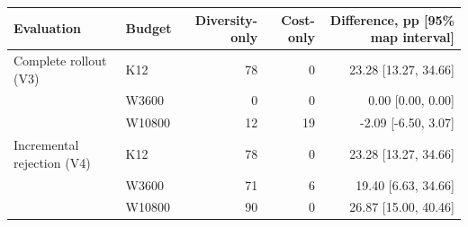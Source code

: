 \begin{tabular}{llrrr}
\toprule
Evaluation & Budget & Diversity-only & Cost-only & Difference, pp [95\% map interval] \\
\midrule
Complete rollout (V3) & K12 & 78 & 0 & 23.28 [13.27, 34.66] \\
 & W3600 & 0 & 0 & 0.00 [0.00, 0.00] \\
 & W10800 & 12 & 19 & -2.09 [-6.50, 3.07] \\
\midrule
Incremental rejection (V4) & K12 & 78 & 0 & 23.28 [13.27, 34.66] \\
 & W3600 & 71 & 6 & 19.40 [6.63, 34.66] \\
 & W10800 & 90 & 0 & 26.87 [15.00, 40.46] \\
\bottomrule
\end{tabular}
